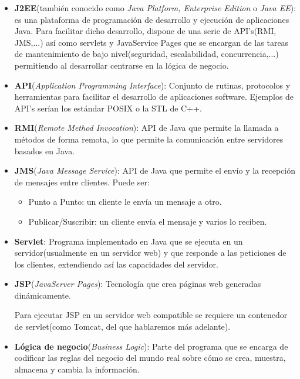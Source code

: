 \documentclass[a4paper, 10pt]{article}
\begin{document}
	\begin{itemize}
		\item \textbf{J2EE}(también conocido como \textit{Java Platform, Enterprise Edition} o \textit{Java EE}): es una plataforma de programación de desarrollo y ejecución de aplicaciones Java. Para facilitar dicho desarrollo, dispone de una serie de API's(RMI, JMS,...) así como servlets y JavaService Pages que se encargan de las tareas de mantenimiento de bajo nivel(seguridad, escalabilidad, concurrencia,...) permitiendo al desarrollar centrarse en la lógica de negocio.\cite{J2EE_Def}
		
		\item \textbf{API}(\textit{Application Programming Interface}): Conjunto de rutinas, protocolos y herramientas para facilitar el desarrollo de aplicaciones software. Ejemplos de API's serían los estándar POSIX o la STL de C++.\cite{API_Def}
		
		\item \textbf{RMI}(\textit{Remote Method Invocation}): API de Java que permite la llamada a métodos de forma remota, lo que permite la comunicación entre servidores basados en Java.\cite{RMI_Def}
		
		\item \textbf{JMS}(\textit{Java Message Service}): API de Java que permite el envío y la recepción de mensajes entre clientes.\cite{JMS_Def} Puede ser:
		\begin{itemize}
			\item Punto a Punto: un cliente le envía un mensaje a otro.
			\item Publicar/Suscribir: un cliente envía el mensaje y varios lo reciben.
		\end{itemize}

		\item \textbf{Servlet}: Programa implementado en Java que se ejecuta en un servidor(usualmente en un servidor web) y que responde a las peticiones de los clientes, extendiendo así las capacidades del servidor.\cite{Servlet_Def}
		
		\item \textbf{JSP}(\textit{JavaServer Pages}): Tecnología que crea páginas web generadas dinámicamente.\cite{JSP_Def}
		
		Para ejecutar JSP en un servidor web compatible se requiere un contenedor de servlet(como Tomcat, del que hablaremos más adelante).
		
		\item \textbf{Lógica de negocio}(\textit{Business Logic}): Parte del programa que se encarga de codificar las reglas del negocio del mundo real sobre cómo se crea, muestra, almacena y cambia la información.\cite{BL_Def}
		
	\end{itemize}
\end{document}
